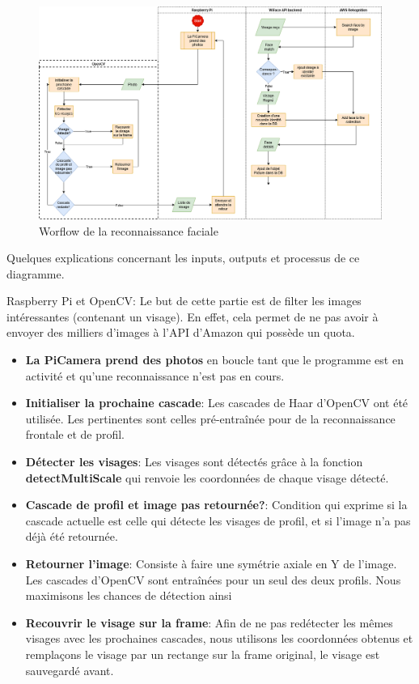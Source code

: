 \clearpage
\newpage

\thispagestyle{empty}
\begin{landscape}
    \centering
\thispagestyle{empty}
\begin{figure}%
     \includegraphics[width=\linewidth]{images/facial_reco/facial_recognition_flow_v2.png}
     \caption{Worflow de la reconnaissance faciale}
     \label{fig:worflow-reco}
\end{figure}
\end{landscape}

Quelques explications concernant les inputs, outputs et processus de ce diagramme.

Raspberry Pi et OpenCV:
Le but de cette partie est de filter les images intéressantes (contenant un visage). En effet,
cela permet de ne pas avoir à envoyer des milliers d'images à l'API d'Amazon qui possède un quota.
\begin{itemize}
    \item \textbf{La PiCamera prend des photos} en boucle tant que le programme est en activité et qu'une reconnaissance n'est pas en cours.
    \item \textbf{Initialiser la prochaine cascade}: Les cascades de Haar d'OpenCV ont été utilisée. Les pertinentes sont celles pré-entraînée pour de la reconnaissance frontale et de profil.
    \item \textbf{Détecter les visages}: Les visages sont détectés grâce à la fonction \textbf{detectMultiScale} qui renvoie les coordonnées de chaque visage détecté.
    \item \textbf{Cascade de profil et image pas retournée?}: Condition qui exprime si la cascade actuelle est celle qui détecte les visages de profil, et si l'image n'a pas déjà été retournée.
    \item \textbf{Retourner l'image}: Consiste à faire une symétrie axiale en Y de l'image. Les cascades d'OpenCV sont entraînées pour un seul des deux profils. Nous maximisons les chances de détection ainsi
    \item \textbf{Recouvrir le visage sur la frame}: Afin de ne pas redétecter les mêmes visages avec les prochaines cascades, nous utilisons les coordonnées obtenus et remplaçons le visage par un rectange sur la frame original, le visage est sauvegardé avant.
\end{itemize}

